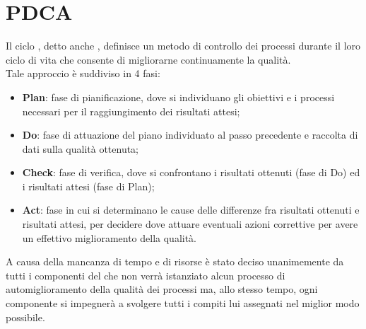 \section{PDCA}
Il ciclo , detto anche , definisce un metodo di controllo dei processi durante il loro ciclo di vita che consente di migliorarne continuamente la qualità. \\
Tale approccio è suddiviso in 4 fasi:
\begin{itemize}
\item \textbf{Plan}: fase di pianificazione, dove si individuano gli obiettivi e i processi necessari per il raggiungimento dei risultati attesi;
\item \textbf{Do}: fase di attuazione del piano individuato al passo precedente e raccolta di dati sulla qualità ottenuta;
\item \textbf{Check}: fase di verifica, dove si confrontano i risultati ottenuti (fase di Do) ed i risultati attesi (fase di Plan);
\item \textbf{Act}: fase in cui si determinano le cause delle differenze fra risultati ottenuti e risultati attesi, per decidere dove attuare eventuali azioni correttive per avere un effettivo miglioramento della qualità.
\end{itemize}

A causa della mancanza di tempo e di risorse è stato deciso unanimemente da tutti i componenti del  che non verrà istanziato alcun processo di automiglioramento della qualità dei processi ma, allo stesso tempo, ogni componente si impegnerà a svolgere tutti i compiti lui assegnati nel miglior modo possibile.

\newpage
